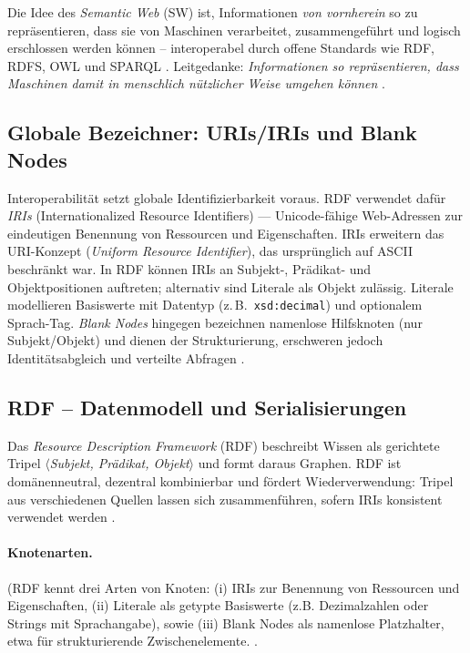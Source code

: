 Die Idee des \emph{Semantic Web} (SW) ist, Informationen \emph{von vornherein} so zu repräsentieren, dass sie von Maschinen verarbeitet, zusammengeführt und logisch erschlossen werden können -- interoperabel durch offene Standards wie RDF, RDFS, OWL und SPARQL \cite{Hitzler,AntoniouVanHarmelen}. Leitgedanke: \emph{Informationen so repräsentieren, dass Maschinen damit in menschlich nützlicher Weise umgehen können} \cite{Hitzler}.


\subsection{Globale Bezeichner: URIs/IRIs und Blank Nodes}

Interoperabilität setzt globale Identifizierbarkeit voraus. RDF verwendet dafür \emph{IRIs} (Internationalized Resource Identifiers) — Unicode-fähige Web-Adressen zur eindeutigen Benennung von Ressourcen und Eigenschaften. IRIs erweitern das URI-Konzept (\emph{Uniform Resource Identifier}), das ursprünglich auf ASCII beschränkt war. In RDF können IRIs an Subjekt-, Prädikat- und Objektpositionen auftreten; alternativ sind Literale als Objekt zulässig. Literale modellieren Basiswerte mit Datentyp (z.\,B.\ \texttt{xsd:decimal}) und optionalem Sprach-Tag. \emph{Blank Nodes} hingegen bezeichnen namenlose Hilfsknoten (nur Subjekt/Objekt) und dienen der Strukturierung, erschweren jedoch Identitätsabgleich und verteilte Abfragen \cite{RDF11Primer,Hitzler}.

\subsection{RDF -- Datenmodell und Serialisierungen}
\label{subsec:rdf}

Das \emph{Resource Description Framework} (RDF) beschreibt Wissen als gerichtete Tripel
\(\langle\)\emph{Subjekt, Prädikat, Objekt}\(\rangle\) und formt daraus Graphen. RDF ist domänenneutral, dezentral kombinierbar und fördert Wiederverwendung: Tripel aus verschiedenen Quellen lassen sich zusammenführen, sofern IRIs konsistent verwendet werden \cite{RDF11Primer,AntoniouVanHarmelen,Hitzler}.

\paragraph{Knotenarten.} (RDF kennt drei Arten von Knoten: (i) IRIs zur Benennung von Ressourcen und Eigenschaften, (ii) Literale als getypte Basiswerte (z.B. Dezimalzahlen oder Strings mit Sprachangabe), sowie (iii) Blank Nodes als namenlose Platzhalter, etwa für strukturierende Zwischenelemente. \cite{RDF11Primer}.

